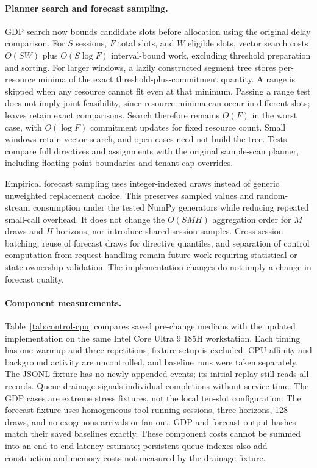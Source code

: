 \paragraph{Planner search and forecast sampling.}
GDP search now bounds candidate slots before allocation using the original delay
comparison. For $S$ sessions, $F$ total slots, and $W$ eligible slots, vector search
costs $O(SW)$ plus $O(S\log F)$ interval-bound work, excluding threshold preparation
and sorting. For larger windows, a lazily constructed segment tree stores
per-resource minima of the exact threshold-plus-commitment quantity. A range is
skipped when any resource cannot fit even at that minimum. Passing a range test
does not imply joint feasibility, since resource minima can occur in different
slots; leaves retain exact comparisons. Search therefore remains $O(F)$ in the
worst case, with $O(\log F)$ commitment updates for fixed resource count. Small
windows retain vector search, and open cases need not build the tree. Tests compare
full directives and assignments with the original sample-scan planner, including
floating-point boundaries and tenant-cap overrides.

Empirical forecast sampling uses integer-indexed draws instead of generic
unweighted replacement choice. This preserves sampled values and random-stream
consumption under the tested NumPy generators while reducing repeated small-call
overhead. It does not change the $O(SMH)$ aggregation order for $M$ draws and $H$
horizons, nor introduce shared session samples. Cross-session batching, reuse of
forecast draws for directive quantiles, and separation of control computation
from request handling remain future work requiring statistical or state-ownership
validation. The implementation changes do not imply a change in forecast quality.

\paragraph{Component measurements.}
Table~\ref{tab:control-cpu} compares saved pre-change medians with the updated
implementation on the same Intel Core Ultra 9 185H workstation. Each timing has
one warmup and three repetitions; fixture setup is excluded. CPU affinity and
background activity are uncontrolled, and baseline runs were taken separately.
The JSONL fixture has no newly appended events; its initial replay still reads
all records. Queue drainage signals individual completions without service time.
The GDP cases are extreme stress fixtures, not the local ten-slot configuration.
The forecast fixture uses homogeneous tool-running sessions, three horizons,
128 draws, and no exogenous arrivals or fan-out. GDP and forecast output hashes
match their saved baselines exactly. These component costs cannot be summed into
an end-to-end latency estimate; persistent queue indexes also add construction
and memory costs not measured by the drainage fixture.

